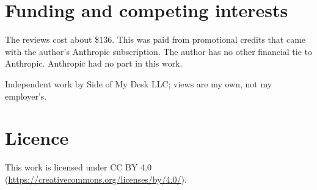 \documentclass[11pt]{article}
\begin{document}
\section*{Funding and competing interests}

The reviews cost about \$136. This was paid from promotional credits that came with the author's Anthropic subscription. The author has no other financial tie to Anthropic. Anthropic had no part in this work.

Independent work by Side of My Desk LLC; views are my own, not my employer's.

\section*{Licence}

This work is licensed under CC BY 4.0 (\url{https://creativecommons.org/licenses/by/4.0/}).



\end{document}
